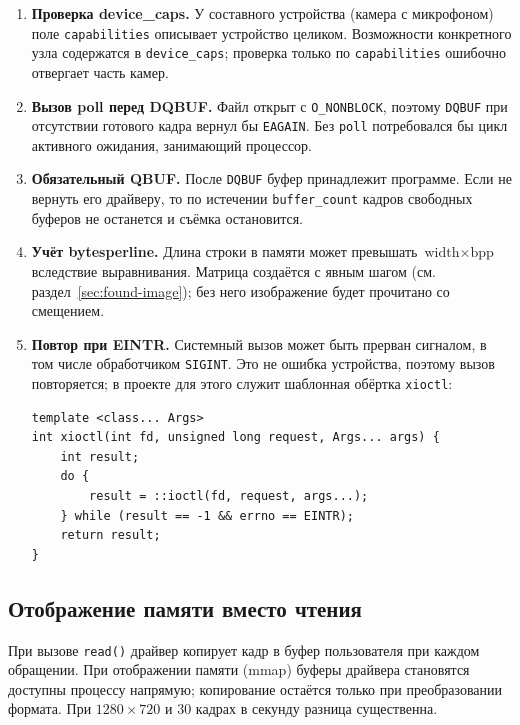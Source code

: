 \documentclass[11pt,a4paper]{article}
\theoremstyle{definition}
\theoremstyle{remark}
\begin{document}
\begin{enumerate}
  \item \textbf{Проверка device\_caps.} У составного устройства
        (камера с микрофоном) поле \texttt{capabilities} описывает устройство
        целиком. Возможности конкретного узла содержатся в
        \texttt{device\_caps}; проверка только по \texttt{capabilities}
        ошибочно отвергает часть камер.
  \item \textbf{Вызов poll перед DQBUF.} Файл открыт с
        \texttt{O\_NONBLOCK}, поэтому \texttt{DQBUF} при отсутствии готового
        кадра вернул бы \texttt{EAGAIN}. Без \texttt{poll} потребовался бы
        цикл активного ожидания, занимающий процессор.
  \item \textbf{Обязательный QBUF.} После \texttt{DQBUF} буфер
        принадлежит программе. Если не вернуть его драйверу, то по истечении
        \texttt{buffer\_count} кадров свободных буферов не останется и съёмка
        остановится.
  \item \textbf{Учёт bytesperline.} Длина строки в памяти может
        превышать $\text{width} \times \text{bpp}$ вследствие выравнивания.
        Матрица создаётся с явным шагом (см. раздел~\ref{sec:found-image});
        без него изображение будет прочитано со смещением.
  \item \textbf{Повтор при EINTR.} Системный вызов может быть прерван
        сигналом, в том числе обработчиком \texttt{SIGINT}. Это не ошибка
        устройства, поэтому вызов повторяется; в проекте для этого служит
        шаблонная обёртка \texttt{xioctl}:
        \begin{lstlisting}
template <class... Args>
int xioctl(int fd, unsigned long request, Args... args) {
    int result;
    do {
        result = ::ioctl(fd, request, args...);
    } while (result == -1 && errno == EINTR);
    return result;
}
        \end{lstlisting}
\end{enumerate}

\subsection{Отображение памяти вместо чтения}

При вызове \texttt{read()} драйвер копирует кадр в буфер пользователя при
каждом обращении. При отображении памяти (mmap) буферы драйвера становятся
доступны процессу напрямую; копирование остаётся только при преобразовании
формата. При $1280 \times 720$ и 30 кадрах в секунду разница существенна.
\end{document}
